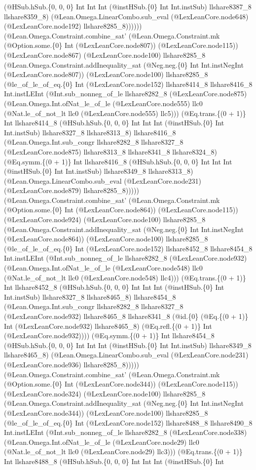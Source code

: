 \documentclass[11pt]{article}
\begin{document}
(@HSub.hSub.\{0, 0, 0\} Int Int Int (@instHSub.\{0\} Int Int.instSub) llshare8387\_8 llshare8359\_8) (@Lean.Omega.LinearCombo.sub\_eval (@LexLeanCore.node648) (@LexLeanCore.node192) llshare8285\_8)))))) (@Lean.Omega.Constraint.combine\_sat' (@Lean.Omega.Constraint.mk (@Option.some.\{0\} Int (@LexLeanCore.node807)) (@LexLeanCore.node115)) (@LexLeanCore.node867) (@LexLeanCore.node100) llshare8285\_8 (@Lean.Omega.Constraint.addInequality\_sat (@Neg.neg.\{0\} Int Int.instNegInt (@LexLeanCore.node807)) (@LexLeanCore.node100) llshare8285\_8 (@le\_of\_le\_of\_eq.\{0\} Int (@LexLeanCore.node152) llshare8414\_8 llshare8416\_8 Int.instLEInt (@Int.sub\_nonneg\_of\_le llshare8282\_8 (@LexLeanCore.node875) (@Lean.Omega.Int.ofNat\_le\_of\_le (@LexLeanCore.node555) llc0 (@Nat.le\_of\_not\_lt llc0 (@LexLeanCore.node555) llc5))) (@Eq.trans.\{(0 + 1)\} Int llshare8414\_8 (@HSub.hSub.\{0, 0, 0\} Int Int Int (@instHSub.\{0\} Int Int.instSub) llshare8327\_8 llshare8313\_8) llshare8416\_8 (@Lean.Omega.Int.sub\_congr llshare8282\_8 llshare8327\_8 (@LexLeanCore.node875) llshare8313\_8 llshare8341\_8 llshare8324\_8) (@Eq.symm.\{(0 + 1)\} Int llshare8416\_8 (@HSub.hSub.\{0, 0, 0\} Int Int Int (@instHSub.\{0\} Int Int.instSub) llshare8349\_8 llshare8313\_8) (@Lean.Omega.LinearCombo.sub\_eval (@LexLeanCore.node231) (@LexLeanCore.node879) llshare8285\_8))))) (@Lean.Omega.Constraint.combine\_sat' (@Lean.Omega.Constraint.mk (@Option.some.\{0\} Int (@LexLeanCore.node864)) (@LexLeanCore.node115)) (@LexLeanCore.node924) (@LexLeanCore.node100) llshare8285\_8 (@Lean.Omega.Constraint.addInequality\_sat (@Neg.neg.\{0\} Int Int.instNegInt (@LexLeanCore.node864)) (@LexLeanCore.node100) llshare8285\_8 (@le\_of\_le\_of\_eq.\{0\} Int (@LexLeanCore.node152) llshare8452\_8 llshare8454\_8 Int.instLEInt (@Int.sub\_nonneg\_of\_le llshare8282\_8 (@LexLeanCore.node932) (@Lean.Omega.Int.ofNat\_le\_of\_le (@LexLeanCore.node548) llc0 (@Nat.le\_of\_not\_lt llc0 (@LexLeanCore.node548) llc4))) (@Eq.trans.\{(0 + 1)\} Int llshare8452\_8 (@HSub.hSub.\{0, 0, 0\} Int Int Int (@instHSub.\{0\} Int Int.instSub) llshare8327\_8 llshare8465\_8) llshare8454\_8 (@Lean.Omega.Int.sub\_congr llshare8282\_8 llshare8327\_8 (@LexLeanCore.node932) llshare8465\_8 llshare8341\_8 (@id.\{0\} (@Eq.\{(0 + 1)\} Int (@LexLeanCore.node932) llshare8465\_8) (@Eq.refl.\{(0 + 1)\} Int (@LexLeanCore.node932)))) (@Eq.symm.\{(0 + 1)\} Int llshare8454\_8 (@HSub.hSub.\{0, 0, 0\} Int Int Int (@instHSub.\{0\} Int Int.instSub) llshare8349\_8 llshare8465\_8) (@Lean.Omega.LinearCombo.sub\_eval (@LexLeanCore.node231) (@LexLeanCore.node936) llshare8285\_8))))) (@Lean.Omega.Constraint.combine\_sat' (@Lean.Omega.Constraint.mk (@Option.some.\{0\} Int (@LexLeanCore.node344)) (@LexLeanCore.node115)) (@LexLeanCore.node324) (@LexLeanCore.node100) llshare8285\_8 (@Lean.Omega.Constraint.addInequality\_sat (@Neg.neg.\{0\} Int Int.instNegInt (@LexLeanCore.node344)) (@LexLeanCore.node100) llshare8285\_8 (@le\_of\_le\_of\_eq.\{0\} Int (@LexLeanCore.node152) llshare8488\_8 llshare8490\_8 Int.instLEInt (@Int.sub\_nonneg\_of\_le llshare8282\_8 (@LexLeanCore.node338) (@Lean.Omega.Int.ofNat\_le\_of\_le (@LexLeanCore.node29) llc0 (@Nat.le\_of\_not\_lt llc0 (@LexLeanCore.node29) llc3))) (@Eq.trans.\{(0 + 1)\} Int llshare8488\_8 (@HSub.hSub.\{0, 0, 0\} Int Int Int (@instHSub.\{0\} Int 
\end{document}
